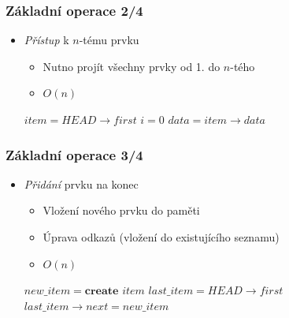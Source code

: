 \documentclass[10pt,xcolor=pdflatex,hyperref={unicode}]{beamer}
\begin{document}
\begin{frame}[fragile]\frametitle{Základní operace 2/4}
    \begin{itemize}
        \item \emph{Přístup} k $n$-tému prvku
            \begin{itemize}
                \item Nutno projít všechny prvky od 1. do $n$-tého
                \item $O(n)$
            \end{itemize}
            
        \begin{algorithm}[H]
            \renewcommand{\emph}[1]{\textit{#1}}
            $item = HEAD \rightarrow first$\;
            $i = 0$\;
        	$data = item \rightarrow data$\;
        \end{algorithm}
    \end{itemize}
\end{frame}

\begin{frame}[fragile]\frametitle{Základní operace 3/4}
    \begin{itemize}
        \item \emph{Přidání} prvku na konec
            \begin{itemize}
                \item Vložení nového prvku do paměti
                \item Úprava odkazů (vložení do existujícího seznamu)
                \item $O(n)$
            \end{itemize}
        
        \begin{algorithm}[H]
            \renewcommand{\emph}[1]{\textit{#1}}
            $new\_item = \textbf{create } item$\;
            $last\_item = HEAD \rightarrow first$\;
        	$last\_item \rightarrow next = new\_item$\;
        \end{algorithm}
    \end{itemize}
\end{frame}
\end{document}
